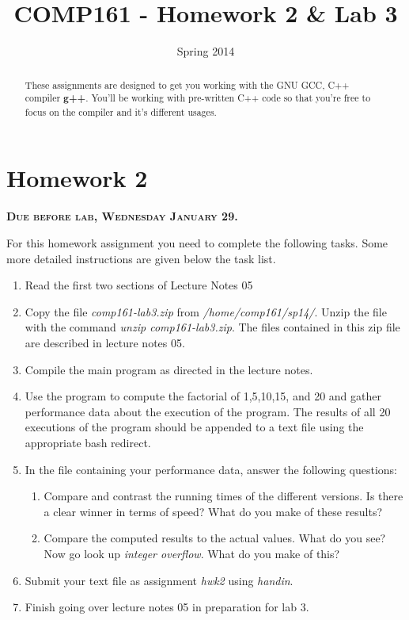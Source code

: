 \documentclass[]{tufte-handout}
\title{COMP161 - Homework 2 \& Lab 3}
\author{}
\date{Spring 2014}
\begin{document}
\maketitle

\begin{abstract}
These assignments are designed to get you working with the GNU GCC, C++ compiler \textbf{g++}.  You'll be working with pre-written C++ code so that you're free to focus on the compiler and it's different usages. 
\end{abstract}

\section{Homework 2}

\begin{center}
\textsc{\textbf{Due before lab, Wednesday January 29.}}
\end{center}

For this homework assignment you need to complete the following tasks. Some more detailed instructions are given below the task list.

\begin{enumerate}
\item Read the first two sections of Lecture Notes 05
\item Copy the file \textit{comp161-lab3.zip} from \textit{/home/comp161/sp14/}. Unzip the file with the command \textit{unzip comp161-lab3.zip}. The files contained in this zip file are described in lecture notes 05.
\item Compile the main program as directed in the lecture notes.  
\item Use the program to compute the factorial of 1,5,10,15, and 20 and gather performance data about the execution of the program. The results of all 20 executions of the program should be appended to a text file using the appropriate bash redirect.
\item In the file containing your performance data, answer the following questions:
\begin{enumerate}
\item Compare and contrast the running times of the different versions. Is there a clear winner in terms of speed? What do you make of these results?
\item Compare the computed results to the actual values. What do you see? Now go look up \textit{integer overflow}. What do you make of this?
\end{enumerate}
\item Submit your text file as assignment \textit{hwk2} using \textit{handin}.
\item Finish going over lecture notes 05 in preparation for lab 3.
\end{enumerate}
\end{document}
